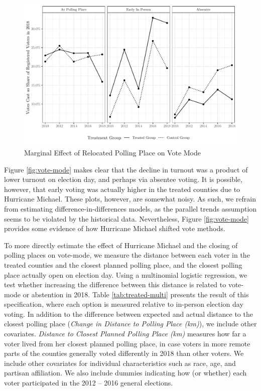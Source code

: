 \documentclass[
  12pt,
]{article}
\begin{document}
\begin{figure}[H]

{\centering \includegraphics{hurricane_michael_files/figure-latex/vote-mode-chunk-1} 

}

\caption{\label{fig:vote-mode}Marginal Effect of Relocated Polling Place on Vote Mode}\label{fig:vote-mode-chunk}
\end{figure}

Figure \ref{fig:vote-mode} makes clear that the decline in turnout was a product of lower turnout on election day, and perhaps via absentee voting. It is possible, however, that early voting was actually higher in the treated counties due to Hurricane Michael. These plots, however, are somewhat noisy. As such, we refrain from estimating difference-in-differences models, as the parallel trends assumption seems to be violated by the historical data. Nevertheless, Figure \ref{fig:vote-mode} provides some evidence of how Hurricane Michael shifted vote methods.

To more directly estimate the effect of Hurricane Michael and the closing of polling places on vote-mode, we measure the distance between each voter in the treated counties and the closest planned polling place, and the closest polling place actually open on election day. Using a multinomial logistic regression, we test whether increasing the difference between this distance is related to vote-mode or abstention in 2018. Table \ref{tab:treated-multi} presents the result of this specification, where each option is measured relative to in-person election day voting. In addition to the difference between expected and actual distance to the closest polling place (\emph{Change in Distance to Polling Place (km)}), we include other covariates. \emph{Distance to Closest Planned Polling Place (km)} measures how far a voter lived from her closest planned polling place, in case voters in more remote parts of the counties generally voted differently in 2018 than other voters. We include other covariates for individual characteristics such as race, age, and partisan affiliation. We also include dummies indicating how (or whether) each voter participated in the 2012 -- 2016 general elections.
\end{document}

